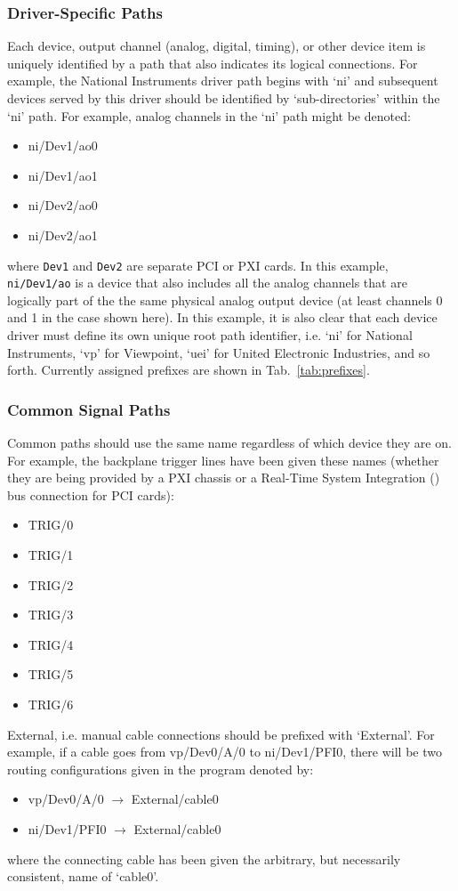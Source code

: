 \subsubsection{Driver-Specific Paths}
Each device, output channel (analog, digital, timing), or other device item is
uniquely identified by a path that also indicates its logical connections.  For
example, the National Instruments driver path begins with `ni' and subsequent
devices served by this driver should be identified by `sub-directories' within
the `ni' path.  For example, analog channels in the `ni' path might be denoted:
%
\begin{itemize}
  \item ni/Dev1/ao0
  \item ni/Dev1/ao1
  \item ni/Dev2/ao0
  \item ni/Dev2/ao1
\end{itemize}
where \texttt{Dev1} and \texttt{Dev2} are separate PCI or PXI cards.
%
In this example, \texttt{ni/Dev1/ao} is a device that also includes all the
analog channels that are logically part of the the same physical analog output
device (at least channels 0 and 1 in the case shown here).  In this example, it
is also clear that each device driver must define its own unique root path
identifier, i.e. `ni' for National Instruments, `vp' for Viewpoint, `uei' for
United Electronic Industries, and so forth.  Currently assigned prefixes are
shown in Tab.~\ref{tab:prefixes}.


\subsubsection{Common Signal Paths}
Common paths should use the same name regardless of which device they are on.
For example, the backplane trigger lines have been given these names (whether
they are being provided by a PXI chassis or a Real-Time System Integration
() bus connection for PCI cards):
\begin{itemize}
  \item TRIG/0
  \item TRIG/1
  \item TRIG/2
  \item TRIG/3
  \item TRIG/4
  \item TRIG/5
  \item TRIG/6
\end{itemize}

External, i.e. manual cable connections should be prefixed with `External'.  For
example, if a cable goes from vp/Dev0/A/0 to ni/Dev1/PFI0, there will be two
routing configurations given in the program denoted by:
\begin{itemize}
  \item vp/Dev0/A/0  $\rightarrow$  External/cable0
  \item ni/Dev1/PFI0 $\rightarrow$  External/cable0
\end{itemize}
where the connecting cable has been given the arbitrary, but necessarily
consistent, name of `cable0'.


